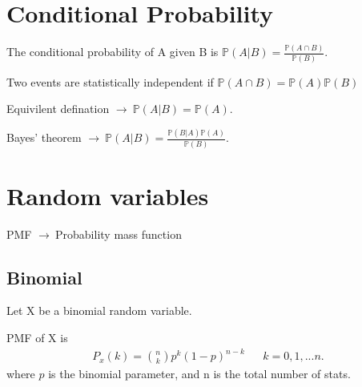 \documentclass[10pt,a4paper]{article}
\newcommand{\prob}{\mathbb{P}}
\newcommand{\g}{$\rightarrow\ $}
\begin{document}
  \section{Conditional Probability}

  \begin{fact}{}{}
    The conditional probability of A given B is $\prob(A|B) = \frac{\prob(A\cap B)}{\prob(B)}$.
  \end{fact}

  \begin{fact}{}{}
    Two events are statistically independent if $\prob(A\cap B) = \prob(A)\prob(B)$
  \end{fact}

  Equivilent defination \g $\prob(A|B) = \prob(A)$.

  \begin{fact}{}{}
    Bayes’ theorem \g $\prob(A|B) = \frac{\prob (B|A)\prob(A)}{\prob(B)}$.
  \end{fact}


  \section{Random variables}

  PMF \g Probability mass function

  \subsection{Binomial}

  \begin{fact}{}{}
    Let X be a binomial random variable.

    PMF of X is
    \begin{align}
      P_x(k) = \binom{n}{k}p^k(1-p)^{n-k} &&k=0,1,...n.
    \end{align}
    where $p$ is the binomial parameter, and n is the total number of stats.

  \end{fact}
\end{document}
